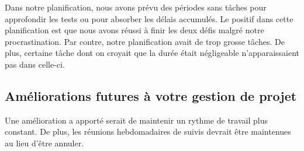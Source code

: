 Dans notre planification, nous avons prévu des périodes sans tâches pour approfondir les tests ou pour absorber les délais accumulés. Le positif dans cette planification est que nous avons réussi à finir les deux défis malgré notre procrastination. Par contre, notre planification avait de trop grosse tâches. De plus, certaine tâche dont on croyait que la durée était négligeable n'apparaissaient pas dans celle-ci.

\subsection{Améliorations futures à votre gestion de projet}

Une amélioration a apporté serait de maintenir un rythme de travail plus constant. De plus, les réunions hebdomadaires de suivis devrait être maintenues au lieu d'être annuler.
